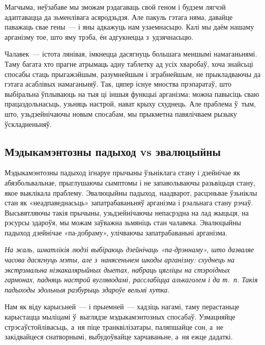 Магчыма, неўзабаве мы зможам рэдагаваць свой геном і будзем лягчэй адаптавацца да зьменлівага асяродзьдзя. Але пакуль гэтага няма, давайце паважаць свае гены~--- і яны адкажуць нам узаемнасьцю. Калі мы даём нашаму арганізму тое, што яму трэба, ён адгукнецца з~удзячнасьцю.

Чалавек~--- істота лянівая, імкнецца дасягнуць большага меншымі намаганьнямі. Таму багата хто прагне атрымаць адну таблетку ад усіх хваробаў, хоча знайсьці спосабы стаць прыгажэйшым, разумнейшым і зграбнейшым, не прыкладваючы да гэтага асаблівых намаганьняў. Так, цяпер існуе мноства прэпаратаў, што выбіральна ўплываюць на тыя ці іншыя функцыі арганізма: можна павысіць сваю працаздольнасьць, узьняць настрой, нават крыху схуднець. Але праблема ў~тым, што, узьдзейнічаючы новым спосабам, мы прыкметна павялічваем рызыку ўскладненьняў. 


\subsection*{Мэдыкамэнтозны падыход vs эвалюцыйны}

Мэдыкамэнтозны падыход ігнаруе прычыны ўзьніклага стану і дзейнічае як абязбольвальнае, прыглушаючы сымптомы і не запавольваючы разьвіцьця стану, якое выклікала праблему. Эвалюцыйны падыход, наадварот, расцэньвае ўзьніклы стан як «неадпаведнасьць» запатрабаваньняў арганізма і рэальнага стану рэчаў. Высьвятляючы такія прычыны, узьдзейнічаючы непасрэдна на лад жыцьця, на рэсурсы здароўя, мы можам заўважна зьмяніць стан чалавека. Эвалюцыйны падыход дзейнічае «па-добраму», улічваючы запатрабаваньні арганізма.

\emph{На жаль, шматлікія людзі выбіраюць дзейнічаць «па-дрэннаму», што дазваляе часова дасягнуць мэты, але з~нанясеньнем шкоды арганізму: схуднець на экстрэмальна нізкакалярыйных дыетах, набраць цягліцы на стэроідных гармонах, падняць настрой вугляводамі, расслабіцца алькаголем і да т.~п. Такія падыходы здольныя разбурыць здароўе вельмі хутка.}

Нам як віду карысьней~--- і прыемней~--- хадзіць нагамі, таму перастаньце карыстацца мыліцамі ў~выглядзе мэдыкамэнтозных спосабаў. Узмацняйце стрэсаўстойлівасьць, а~ня піце транквілізатары, паляпшайце сон, а~не закідвайцеся снатворнымі, выбудоўвайце харчаваньне, а~ня ежце дадаткі.

